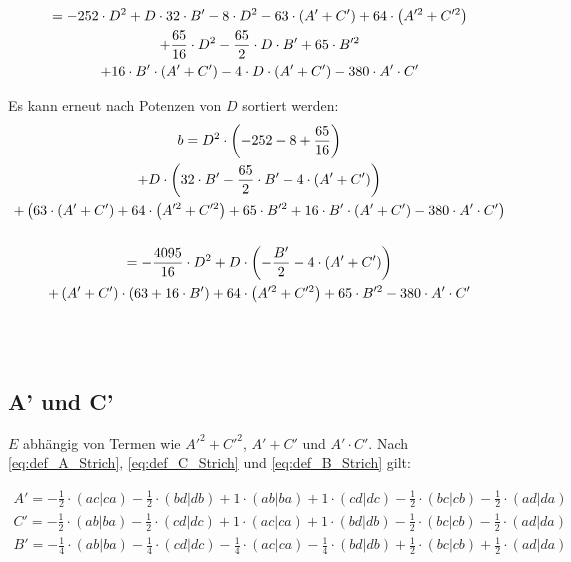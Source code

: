 \documentclass[12pt,a4paper]{article}
\begin{document}
\begin{gather}
= -252 \cdot D ^2  + D \cdot 32 \cdot B' - 8 \cdot D ^2 
-63\cdot \left( A' + C' \right) +64\cdot \left(A'^2 + C'^2 \right) \\
\notag
+ \frac{65}{16}\cdot D ^2 - \frac{65}{2}\cdot D \cdot B' + 65 \cdot B'^2 \\ \notag 
+ 16 \cdot B' \cdot \left(A' + C' \right) 
- 4 \cdot D \cdot \left(A' + C'\right) 
- 380 \cdot A' \cdot C' 
\end{gather}


Es kann erneut nach Potenzen von $D$ sortiert werden: 
\begin{gather}
b = 
D^2 \cdot  \left(
-252-8+\frac{65}{16}
 \right) 
\\ \notag
+ D \cdot \left(
32\cdot B' - \frac{65}{2} \cdot B' - 4\cdot \left(A' + C'\right) 
 \right) \\ \notag
+ \left( 
63\cdot \left(A' + C'\right) + 64 \cdot  \left(A'^2 + C'^2\right)
+ 65 \cdot B'^2 + 16 \cdot B' \cdot  \left(A' + C'\right)- 380 \cdot A' \cdot C'
\right)  \\ \notag \\ \label{eq:b_mitBStrich}
=  -\frac{4095}{16} \cdot D^2 
+ D\cdot \left( 
- \frac{B'}{2} - 4\cdot \left(A' + C'\right) 
\right) \\ \notag
+  
\left(A' + C'\right) \cdot \left( 63+ 16\cdot B'\right) 
+ 64 \cdot  \left(A'^2 + C'^2\right)
+ 65 \cdot B'^2 
- 380 \cdot A' \cdot C'
\end{gather} \\



\begin{gather}
\end{gather} \\


\subsection{A' und C'}
$E$ abhängig von Termen wie $A'^2+C'^2$, $A'+C'$ und $A' \cdot C'$. Nach \eqref{eq:def_A_Strich}, \eqref{eq:def_C_Strich} und \eqref{eq:def_B_Strich} gilt: 

\begin{gather}
A' = - \frac{1}{2} \cdot (ac|ca) - \frac{1}{2} \cdot (bd|db) + 1 \cdot (ab|ba) + 1 \cdot (cd|dc) - \frac{1}{2} \cdot (bc|cb) - \frac{1}{2} \cdot (ad|da) \\ 
C' =  -  \frac{1}{2} \cdot (ab|ba) - \frac{1}{2} \cdot (cd|dc) + 1 \cdot (ac|ca) + 1 \cdot (bd|db) - \frac{1}{2} \cdot (bc|cb) - \frac{1}{2} \cdot (ad|da) \\
 B' = - \frac{1}{4} \cdot (ab|ba) - \frac{1}{4} \cdot (cd|dc) - \frac{1}{4} \cdot (ac|ca) -  \frac{1}{4} \cdot (bd|db) + \frac{1}{2} \cdot (bc|cb) + \frac{1}{2} \cdot (ad|da) \label{eq:b_strich}
\end{gather} \\
\end{document}
